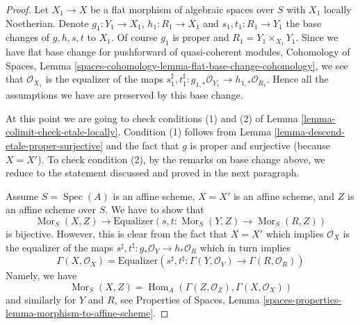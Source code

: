 \documentclass[10pt,a4paper]{amsart}
\theoremstyle{plain}
\theoremstyle{definition}
\theoremstyle{remark}
\numberwithin{equation}{subsection}
\def\Spec{\mathop{\mathrm{Spec}}}
\def\Hom{\mathop{\mathrm{Hom}}\nolimits}
\def\Mor{\mathop{\mathrm{Mor}}\nolimits}
\begin{document}
\begin{proof}
\medskip\noindent
Let $X_1 \to X$ be a flat morphism of algebraic spaces over $S$ with $X_1$
locally Noetherian. Denote $g_1 : Y_1 \to X_1$, $h_1 : R_1 \to X_1$ and
$s_1, t_1 : R_1 \to Y_1$ the base changes of $g, h, s, t$ to $X_1$.
Of course $g_1$ is proper and $R_1 = Y_1 \times_{X_1} Y_1$.
Since we have flat base change for pushforward of quasi-coherent modules,
Cohomology of Spaces, Lemma
\ref{spaces-cohomology-lemma-flat-base-change-cohomology}, we see that
$\mathcal{O}_{X_1}$ is the equalizer of the maps
$s_1^\sharp, t_1^\sharp : g_{1, *}\mathcal{O}_{Y_1} \to
h_{1, *}\mathcal{O}_{R_1}$. Hence all the assumptions we have
are preserved by this base change.

\medskip\noindent
At this point we are going to check conditions (1) and (2) of
Lemma \ref{lemma-colimit-check-etale-locally}. Condition (1)
follows from Lemma \ref{lemma-descend-etale-proper-surjective}
and the fact that $g$ is proper and surjective (because $X = X'$).
To check condition (2), by the remarks on base change above,
we reduce to the statement discussed and proved in the next paragraph.

\medskip\noindent
Assume $S = \Spec(A)$ is an affine scheme, $X = X'$ is an affine scheme, and
$Z$ is an affine scheme over $S$. We have to show that
$$
\Mor_S(X, Z) \longrightarrow
\text{Equalizer}(s, t : \Mor_S(Y, Z) \to \Mor_S(R, Z))
$$
is bijective. However, this is clear from the fact that $X = X'$
which implies $\mathcal{O}_X$ is the equalizer of the maps
$s^\sharp, t^\sharp : g_*\mathcal{O}_Y \to h_*\mathcal{O}_R$
which in turn implies
$$
\Gamma(X, \mathcal{O}_X) =
\text{Equalizer}\left(
s^\sharp, t^\sharp : \Gamma(Y, \mathcal{O}_Y) \to
\Gamma(R, \mathcal{O}_R)
\right)
$$
Namely, we have
$$
\Mor_S(X, Z) = \Hom_A(\Gamma(Z, \mathcal{O}_Z), \Gamma(X, \mathcal{O}_X))
$$
and similarly for $Y$ and $R$, see Properties of Spaces, Lemma
\ref{spaces-properties-lemma-morphism-to-affine-scheme}.
\end{proof}



\end{document}
